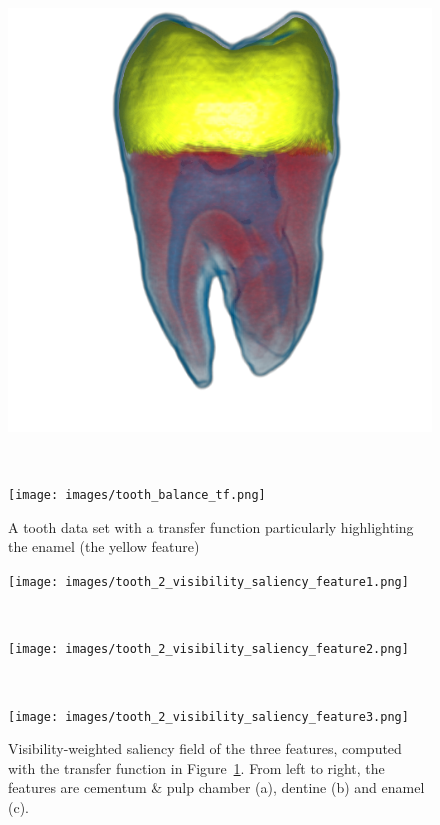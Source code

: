\begin{figure}
	\centering
	\begin{minipage}{.6\textwidth}
		\includegraphics[width=1\linewidth]{images/tooth_balance_gpu.png}
		\subcaption{}
	\end{minipage}~
	\begin{minipage}{.3\textwidth}
		\texttt{[image: images/tooth\_balance\_tf.png]}
		\subcaption{}
	\end{minipage}
	\caption{A tooth data set with a transfer function particularly highlighting the enamel (the yellow feature)}
	\label{fig:tooth_2}
\end{figure}

\begin{figure}
	\centering
	\begin{minipage}{.3\textwidth}
		\texttt{[image: images/tooth\_2\_visibility\_saliency\_feature1.png]}
		\subcaption{}
	\end{minipage}~
	\begin{minipage}{.3\textwidth}
		\texttt{[image: images/tooth\_2\_visibility\_saliency\_feature2.png]}
		\subcaption{}
	\end{minipage}~
	\begin{minipage}{.3\textwidth}
		\texttt{[image: images/tooth\_2\_visibility\_saliency\_feature3.png]}
		\subcaption{}
	\end{minipage}
	\caption{Visibility-weighted saliency field of the three features, computed with the transfer function in Figure~\ref{fig:tooth_2}. From left to right, the features are cementum \& pulp chamber (a), dentine (b) and enamel (c).}
	\label{fig:tooth_saliency_field_2}
\end{figure}

